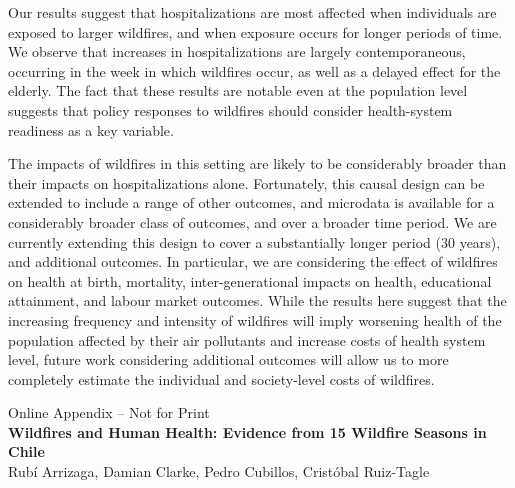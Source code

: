 \documentclass[11pt]{article}
\begin{document}
\begin{spacing}{1.5}
Our results suggest that hospitalizations are most affected when individuals are exposed to larger wildfires, and when exposure occurs for longer periods of time.  We observe that increases in hospitalizations are largely contemporaneous, occurring in the week in which wildfires occur, as well as a delayed effect for the elderly. The fact that these results are notable even at the population level suggests that policy responses to wildfires should consider health-system readiness as a key variable.

The impacts of wildfires in this setting are likely to be considerably broader than their impacts on hospitalizations alone.  Fortunately, this causal design can be extended to include a range of other outcomes, and microdata is available for a considerably broader class of outcomes, and over a broader time period.  We are currently extending this design to cover a substantially longer period (30 years), and additional outcomes.  In particular, we are considering the effect of wildfires on health at birth, mortality, inter-generational impacts on health, educational attainment, and labour market outcomes.  While the results here suggest that the increasing frequency and intensity of wildfires will imply worsening health of the population affected by their air pollutants and increase costs of health system level, future work considering additional outcomes will allow us to more completely estimate the individual and society-level costs of wildfires.





\end{spacing}
\clearpage



\begin{spacing}{1.3}


  \newpage
  
\appendix
\setcounter{page}{1}
\renewcommand{\thepage}{A\arabic{page}}



\begin{center}
{\Large Online Appendix -- Not for Print}\\
\textbf{Wildfires and Human Health: Evidence from 15 Wildfire Seasons in Chile} \\
Rub\'i Arrizaga, Damian Clarke, Pedro Cubillos, Crist\'obal Ruiz-Tagle
\end{center}
\end{spacing}
\end{document}
